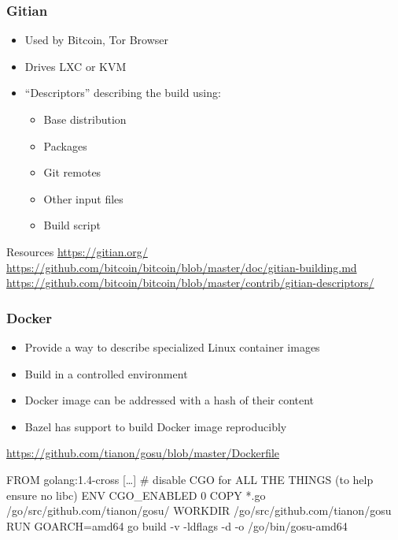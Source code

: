 \documentclass[14pt,aspectratio=169]{beamer}
\begin{document}
\begin{frame}
 \frametitle{Gitian}

 \begin{itemize}
  \item Used by Bitcoin, Tor Browser
  \item Drives LXC or KVM
  \item “Descriptors” describing the build using:
   \begin{itemize}
    \item Base distribution
    \item Packages
    \item Git remotes
    \item Other input files
    \item Build script
   \end{itemize}
 \end{itemize}

 \vfill
 \begin{block}{\footnotesize Resources}\footnotesize
 \url{https://gitian.org/}\\
 \url{https://github.com/bitcoin/bitcoin/blob/master/doc/gitian-building.md}\\
 \url{https://github.com/bitcoin/bitcoin/blob/master/contrib/gitian-descriptors/}
 \end{block}
\end{frame}

\begin{frame}[fragile]
 \frametitle{Docker}

 \begin{itemize}
  \item Provide a way to describe specialized Linux container images
  \item Build in a controlled environment
  \item Docker image can be addressed with a hash of their content
  \item Bazel has support to build Docker image reproducibly
 \end{itemize}

 \begin{block}{\footnotesize \url{https://github.com/tianon/gosu/blob/master/Dockerfile}}\footnotesize
\begin{semiverbatim}
FROM golang:1.4-cross
[…]
# disable CGO for ALL THE THINGS (to help ensure no libc)
ENV CGO\_ENABLED 0
COPY *.go /go/src/github.com/tianon/gosu/
WORKDIR /go/src/github.com/tianon/gosu
RUN GOARCH=amd64 go build -v -ldflags -d -o /go/bin/gosu-amd64
\end{semiverbatim}
 \end{block}
\end{frame}
\end{document}
